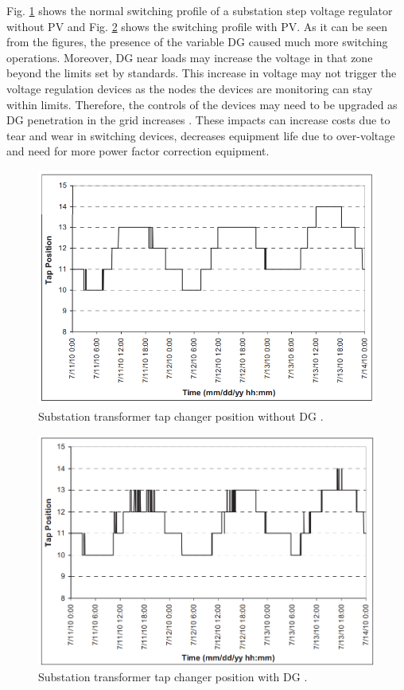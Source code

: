 Fig. \ref{fig:VR4} shows the normal switching profile of a substation step voltage regulator without PV and Fig. \ref{fig:VR5} shows the switching profile with PV. As it can be seen from the figures, the presence of the variable DG caused much more switching operations. Moreover, DG near loads may increase the voltage in that zone beyond the limits set by standards. This increase in voltage may not trigger the voltage regulation devices as the nodes the devices are monitoring can stay within limits. Therefore, the controls of the devices may need to be upgraded as DG penetration in the grid increases \cite{IEE13}. These impacts can increase costs due to tear and wear in switching devices, decreases equipment life due to over-voltage and need for more power factor correction equipment. 

\begin{figure}[!h]
\centering
\includegraphics[width=0.85\linewidth]{figs/VR4.png}
\caption[Substation transformer tap changer position without DG]{Substation transformer tap changer position without DG \cite{GKA11}.}
\label{fig:VR4}
\end{figure}
 
 \begin{figure}[!h]
\centering
\includegraphics[width=0.85\linewidth]{figs/VR5.png}
\caption[Substation transformer tap changer position with DG.]{Substation transformer tap changer position with DG \cite{GKA11}.}
\label{fig:VR5}
\end{figure}

